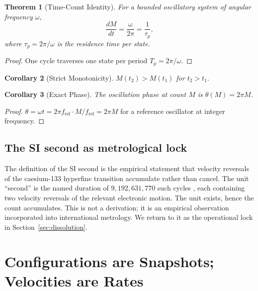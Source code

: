 \documentclass[twocolumn,10pt,a4paper]{article}
\theoremstyle{thmstyle}
\newtheorem{theorem}{Theorem}[section]
\newtheorem{corollary}[theorem]{Corollary}
\theoremstyle{definition}
\theoremstyle{remark}
\begin{document}
\begin{theorem}[Time-Count Identity]
\label{thm:tc}
For a bounded oscillatory system of angular frequency $\omega$,
\begin{equation}
\boxed{\;\frac{dM}{dt}=\frac{\omega}{2\pi}=\frac{1}{\tau_{p}},\;}
\label{eq:tc}
\end{equation}
where $\tau_{p}=2\pi/\omega$ is the residence time per state.
\end{theorem}

\begin{proof}
One cycle traverses one state per period $T_{p}=2\pi/\omega$.
\end{proof}

\begin{corollary}[Strict Monotonicity]
\label{cor:mono}
$M(t_{2})>M(t_{1})$ for $t_{2}>t_{1}$.
\end{corollary}

\begin{corollary}[Exact Phase]
\label{cor:phase}
The oscillation phase at count $M$ is $\theta(M)=2\pi M$.
\end{corollary}

\begin{proof}
$\theta=\omega t=2\pi f_{\mathrm{ref}}\cdot M/f_{\mathrm{ref}}=2\pi M$
for a reference oscillator at integer frequency.
\end{proof}

\subsection{The SI second as metrological lock}

The definition of the SI second is the empirical statement that
velocity reversals of the caesium-133 hyperfine transition accumulate
rather than cancel. The unit ``second'' is the named duration of
$9{,}192{,}631{,}770$ such cycles \citep{si2019}, each containing two
velocity reversals of the relevant electronic motion. The unit
exists, hence the count accumulates. This is not a derivation; it is
an empirical observation incorporated into international metrology.
We return to it as the operational lock in Section~\ref{sec:dissolution}.

\section{Configurations are Snapshots; Velocities are Rates}
\label{sec:configuration}
\end{document}

